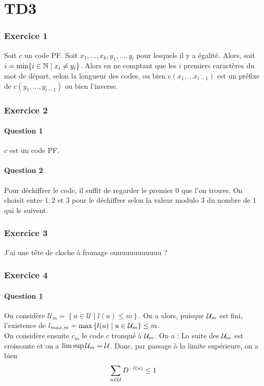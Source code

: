 \documentclass{cours}
\begin{document}
\part{TD3}
\section{Exercice 1}
Soit $c$ un code PF. Soit $x_1, \ldots, x_{k}, y_{1}, \ldots, y_{l}$ pour lesquels il y a égalité. Alors, soit $i = \min \{i \in \mathbb{N} \mid x_{i} \neq y_{i}\}$. Alors en ne comptant que les $i$ premiers caractères du mot de départ, selon la longueur des codes, ou bien $c(x_{1},\ldots x_{i - 1})$ est un préfixe de $c(y_{1}, \ldots, y_{i - 1})$ ou bien l'inverse.

\section{Exercice 2}
\subsection{Question 1}
$c$ est un code PF. 

\subsection{Question 2}
Pour déchiffrer le code, il suffit de regarder le premier $0$ que l'on trouve. On choisit entre $1, 2$ et $3$ pour le déchiffrer selon la valeur modulo $3$ du nombre de $1$ qui le suivent. 

\section{Exercice 3}
J'ai une tête de cloche à fromage ouuuuuuuuuuuu ?

\section{Exercice 4}
\subsection{Question 1}
On considère $\mathcal{U}_{m} = \left\{u \in \mathcal{U} \mid l(u) \leq m\right\}$. On a alors, puisque $\mathcal{U}_{m}$ est fini, l'existence de $l_{max, m} = \max \left\{l(u) \mid u \in \mathcal{U}_{m}\right\} \leq m$. \\
On considère ensuite $c_{m}$ le code $c$ tronqué à $\mathcal{U}_{m}$. On a :  
La suite des $\mathcal{U}_{m}$ est croissante et on a $\limsup \mathcal{U}_{m} = \mathcal{U}$. Donc, par passage à la limite supérieure, on a bien 
\[
    \sum_{u \in \mathcal{U}}D^{-l(u)} \leq 1
\]
\end{document}
